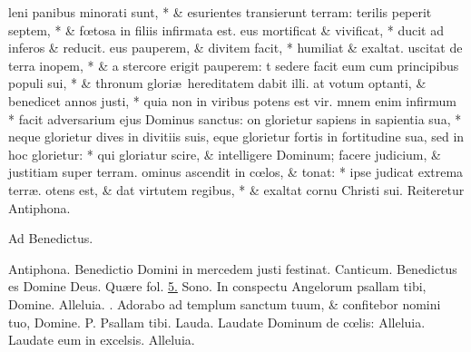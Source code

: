 \documentclass[letter,11pt]{book}
\makeatletter
\DeclareRobustCommand{\Vbar}{\vers@resp{-0.1em}{V}}
\newcommand{\vers@resp@sym}{\raisebox{0.2ex}{\rotatebox[origin=c]{-20}{$\m@th\rceil$}}}
\newcommand{\vers@resp}[2]{%
  {\ooalign{\hidewidth\kern#1\vers@resp@sym\hidewidth\cr#2\cr}}%
}%
\def\P{\color{Red} P. \color{black}}
\def\V{\color{Red} \Vbar . \color{black}}
\makeatother
\begin{document}
\begin{multicols*}{2}
leni panibus minorati sunt, * \& esurientes transierunt terram:
terilis peperit septem, * \& f\oe tosa in filiis infirmata est.
eus mortificat \& vivificat, * ducit ad inferos \& reducit.
eus pauperem, \& divitem facit, * humiliat \& exaltat.
uscitat de terra inopem, * \& a stercore erigit pauperem:
t sedere facit eum cum principibus populi sui, * \& thronum glori\ae \ hereditatem dabit illi.
at votum optanti, \& benedicet annos justi, * quia non in viribus potens est vir.
mnem enim infirmum * facit adversarium ejus Dominus sanctus:
on glorietur sapiens in sapientia sua, * neque glorietur dives in divitiis suis,
eque glorietur fortis in fortitudine sua, sed in hoc glorietur: * qui gloriatur scire, \& intelligere Dominum; facere judicium, \& justitiam super terram.
ominus ascendit in c\oe los, \& tonat: * ipse judicat extrema terr\ae .
otens est, \& dat virtutem regibus, * \& exaltat cornu Christi sui.
\newline \color{Red} Reiteretur Antiphona. \color{black}
\vspace{-.5em} \begin{center} \color{Red} Ad Benedictus. \color{black} \end{center} \vspace{-.5em}
\par \noindent \color{Red} Antiphona. \color{black} Benedictio Domini in mercedem justi festinat.
\newline \color{Red} Canticum. \color{black} Benedictus es Domine Deus. \color{Red} Qu\ae re fol. \color{black} \hyperlink{benedictus}{5.}
\newline \color{Red} Sono. \color{black} In conspectu Angelorum psallam tibi, Domine. Alleluia. \V Adorabo ad templum sanctum tuum, \& confitebor nomini tuo, Domine. \P Psallam tibi.
\newline \color{Red} Lauda. \color{black} Laudate Dominum de c\oe lis: Alleluia. Laudate eum in excelsis. Alleluia.

\end{multicols*}
\end{document}
